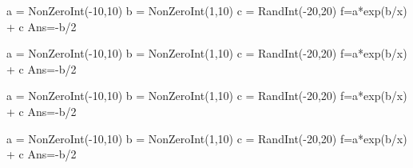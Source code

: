 \begin{sagesilent}
a = NonZeroInt(-10,10)
b = NonZeroInt(1,10)
c = RandInt(-20,20)
f=a*exp(b/x) + c
Ans=-b/2
\end{sagesilent}





\begin{sagesilent}
a = NonZeroInt(-10,10)
b = NonZeroInt(1,10)
c = RandInt(-20,20)
f=a*exp(b/x) + c
Ans=-b/2
\end{sagesilent}





\begin{sagesilent}
a = NonZeroInt(-10,10)
b = NonZeroInt(1,10)
c = RandInt(-20,20)
f=a*exp(b/x) + c
Ans=-b/2
\end{sagesilent}





\begin{sagesilent}
a = NonZeroInt(-10,10)
b = NonZeroInt(1,10)
c = RandInt(-20,20)
f=a*exp(b/x) + c
Ans=-b/2
\end{sagesilent}





